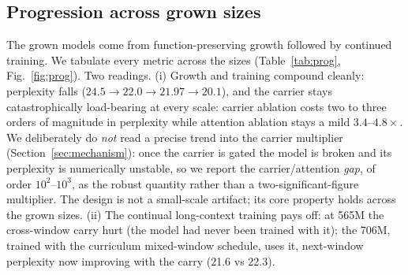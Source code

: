 \documentclass[10pt,twocolumn]{article}
\begin{document}
\subsection{Progression across grown sizes}
The grown models come from function-preserving growth followed by continued training. We tabulate every metric across the sizes (Table~\ref{tab:prog}, Fig.~\ref{fig:prog}). Two readings. (i) Growth and training compound cleanly: perplexity falls ($24.5 \to 22.0 \to 21.97 \to 20.1$), and the carrier stays catastrophically load-bearing at every scale: carrier ablation costs two to three orders of magnitude in perplexity while attention ablation stays a mild $3.4$--$4.8\times$. We deliberately do \emph{not} read a precise trend into the carrier multiplier (Section~\ref{sec:mechanism}): once the carrier is gated the model is broken and its perplexity is numerically unstable, so we report the carrier/attention \emph{gap}, of order $10^2$--$10^3$, as the robust quantity rather than a two-significant-figure multiplier. The design is not a small-scale artifact; its core property holds across the grown sizes. (ii) The continual long-context training pays off: at 565M the cross-window carry hurt (the model had never been trained with it); the 706M, trained with the curriculum mixed-window schedule, uses it, next-window perplexity now improving with the carry (21.6 vs 22.3).
\end{document}
